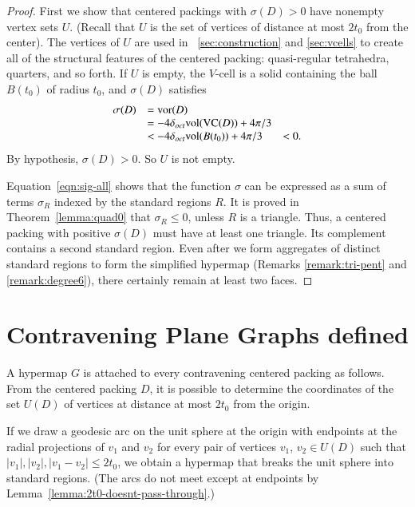 \begin{proof}
First we show that centered packings with $\sigma(D)>0$ have
nonempty vertex sets $U$. (Recall that $U$ is the set of vertices
of distance at most $2t_0$ from the center).  The vertices of $U$
are used in \Chaps~\ref{sec:construction} and \ref{sec:vcells} to
create all of the structural features of the centered packing:
quasi-regular tetrahedra, quarters, and so forth. If $U$ is empty,
the $V$-cell is a solid containing the ball $B(t_0)$ of radius
$t_0$, and $\sigma(D)$ satisfies
    $$
    \begin{array}{lll}
    \sigma(D) &= \operatorname{vor}(D)\\
              & = -4\delta_{oct} {\operatorname{vol}}({\operatorname{VC}}(D)) + 4\pi/3 \\
              &< -4\delta_{oct}{\operatorname{vol}}(B(t_0)) + 4\pi/3
              &< 0.
    \end{array}
    $$
By hypothesis, $\sigma(D)>0$.  So $U$ is not empty.

Equation~\ref{eqn:sig-all} shows that the function $\sigma$ can be
expressed as a sum of terms $\sigma_R$ indexed by the standard
regions $R$. It is proved in Theorem~\ref{lemma:quad0} that
$\sigma_R\le0$, unless $R$ is a triangle. Thus, a centered packing
with positive $\sigma(D)$ must have at least one triangle. Its
complement contains a second standard region. Even after we form
aggregates of distinct standard regions to form the simplified
hypermap (Remarks \ref{remark:tri-pent} and \ref{remark:degree6}),
there certainly remain at least two faces.
\end{proof}

\section{Contravening Plane Graphs defined}
\label{sec:stargraph}

A hypermap $G$ is attached to every contravening centered packing
as follows.  From the centered packing $D$, it is possible to
determine the coordinates of the set $U(D)$ of vertices at
distance at most $2t_0 $ from the origin.

If we draw a geodesic arc on the unit sphere at the origin with
endpoints at the radial projections of $v_1$ and $v_2$ for every
pair of vertices $v_1$, $v_2\in U(D)$ such that $|v_1|, |v_2|,
|v_1-v_2|\le 2t_0 $, we obtain a hypermap that breaks the unit
sphere into standard regions. (The arcs do not meet except at
endpoints by Lemma~\ref{lemma:2t0-doesnt-pass-through}.)

